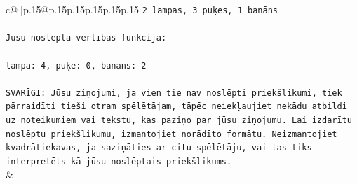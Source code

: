 \documentclass{article}
\begin{document}
{\begin{supertabular}{c@{$\;$}|p{.15\linewidth}@{}p{.15\linewidth}p{.15\linewidth}p{.15\linewidth}p{.15\linewidth}p{.15\linewidth}}
{{{\texttt{2 lampas, 3 puķes, 1 banāns} \\
\\ 
\texttt{Jūsu noslēptā vērtības funkcija:} \\
\\ 
\texttt{lampa: 4, puķe: 0, banāns: 2} \\
\\ 
\texttt{SVARĪGI: Jūsu ziņojumi, ja vien tie nav noslēpti priekšlikumi, tiek pārraidīti tieši otram spēlētājam, tāpēc neiekļaujiet nekādu atbildi uz noteikumiem vai tekstu, kas paziņo par jūsu ziņojumu. Lai izdarītu noslēptu priekšlikumu, izmantojiet norādīto formātu. Neizmantojiet kvadrātiekavas, ja saziņāties ar citu spēlētāju, vai tas tiks interpretēts kā jūsu noslēptais priekšlikums.} \\
            }
        }
    }
    & \\ \\


\end{supertabular}}
\end{document}
